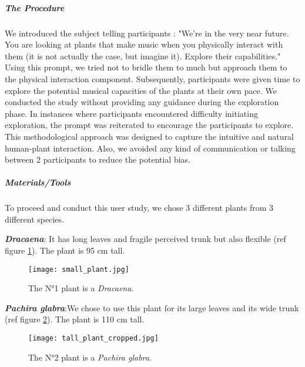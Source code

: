 \subparagraph{The Procedure} 
We introduced the subject telling participants : 
"We're in the very near future. You are looking at plants that make music when you physically interact with them (it is not actually the case, but imagine it). Explore their capabilities."
Using this prompt, we tried not to bridle them to much but approach them to the physical interaction component.
Subsequently, participants were given time to explore the potential musical capacities of the plants at their own pace.
We conducted the study without providing any guidance during the exploration phase.
In instances where participants encountered difficulty initiating exploration, the prompt was reiterated to encourage the participants to explore.
This methodological approach was designed to capture the intuitive and natural human-plant interaction.
Also, we avoided any kind of communication or talking between 2 participants to reduce the potential bias.


\subparagraph{Materials/Tools}

To proceed and conduct this user study, we chose 3 different plants from 3 different species.


\textit{\textbf{Dracaena}}: It has long leaves and fragile perceived trunk but also flexible (ref figure \ref{fig:small_plant}). The plant is 95 cm tall.

\begin{figure}[h!]
    \centering
    \texttt{[image: small\_plant.jpg]}
    \caption{The N°1 plant is a \textit{Dracaena}.}
    
    \vspace{-0.5cm}
    \label{fig:small_plant}
    \vspace{0.2cm}
\end{figure}




\textit{\textbf{Pachira glabra}}:We chose to use this plant for its large leaves and its wide trunk (ref figure \ref{fig:tall_plant}).
The plant is 110 cm tall.

\begin{figure}[h!]
    \centering
    \texttt{[image: tall\_plant\_cropped.jpg]}
    \caption{The N°2 plant is a \textit{Pachira glabra}.}
    
    \vspace{-0.5cm}
    \label{fig:tall_plant}
    \vspace{0.2cm}
\end{figure}



